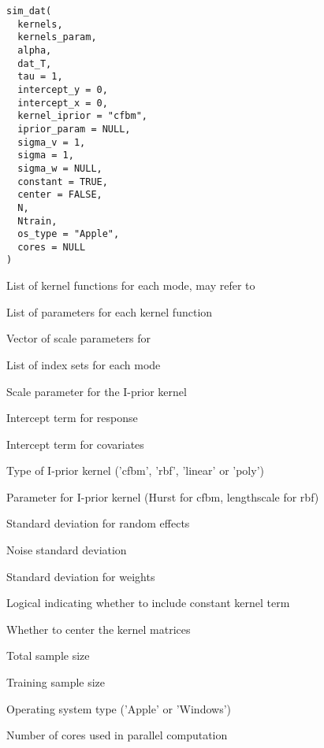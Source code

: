 \documentclass[a4paper]{book}
\begin{document}
%
\begin{Usage}
\begin{verbatim}
sim_dat(
  kernels,
  kernels_param,
  alpha,
  dat_T,
  tau = 1,
  intercept_y = 0,
  intercept_x = 0,
  kernel_iprior = "cfbm",
  iprior_param = NULL,
  sigma_v = 1,
  sigma = 1,
  sigma_w = NULL,
  constant = TRUE,
  center = FALSE,
  N,
  Ntrain,
  os_type = "Apple",
  cores = NULL
)
\end{verbatim}
\end{Usage}
%
\begin{Arguments}
\begin{ldescription}
\item[\code{kernels}] List of kernel functions for each mode, may refer to 

\item[\code{kernels\_param}] List of parameters for each kernel function

\item[\code{alpha}] Vector of scale parameters for 

\item[\code{dat\_T}] List of index sets for each mode

\item[\code{tau}] Scale parameter for the I-prior kernel

\item[\code{intercept\_y}] Intercept term for response

\item[\code{intercept\_x}] Intercept term for covariates

\item[\code{kernel\_iprior}] Type of I-prior kernel ('cfbm', 'rbf', 'linear' or 'poly')

\item[\code{iprior\_param}] Parameter for I-prior kernel (Hurst for cfbm, lengthscale for rbf)

\item[\code{sigma\_v}] Standard deviation for random effects

\item[\code{sigma}] Noise standard deviation

\item[\code{sigma\_w}] Standard deviation for weights

\item[\code{constant}] Logical indicating whether to include constant kernel term

\item[\code{center}] Whether to center the kernel matrices

\item[\code{N}] Total sample size

\item[\code{Ntrain}] Training sample size

\item[\code{os\_type}] Operating system type ('Apple' or 'Windows')

\item[\code{cores}] Number of cores used in parallel computation
\end{ldescription}
\end{Arguments}
\end{document}
